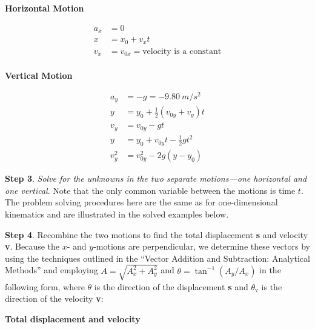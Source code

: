 \documentclass[../../main-ap-physics.tex]{subfiles}
\begin{document}
\begin{center}
    \textbf{Horizontal Motion}
\end{center}

\vspace{-1em}

\begin{align}
    a_x &= 0 \\[1ex]
    x &= x_0 + v_x t \\[1ex]
    v_x &= v_{0x} = \text{velocity is a constant} \\[1ex]
\end{align}

\begin{center}
    \textbf{Vertical Motion}
\end{center}

\vspace{-1em}

\begin{align}
    a_y &= -g = -\SI{9.80}{m/s^2} \\[1ex]
    y &= y_0 + \frac{1}{2} \left(v_{0y} + v_y\right) t \\[1ex]
    v_y &= v_{0y} - gt \\[1ex]
    y &= y_0 + v_{0y} t - \frac{1}{2} g t^2 \\[1ex]
    v_y^2 &= v_{0y}^2 - 2 g \left(y - y_0\right)
\end{align}

\textbf{Step 3}. \textit{Solve for the unknowns in the two separate motions---one horizontal and one vertical}. Note that the only common variable between the motions is time $t$. The problem solving procedures here are the same as for one-dimensional \gls{kinematics} and are illustrated in the solved examples below.

\vspace{1em}

\textbf{Step 4}. Recombine the two motions to find the total displacement \textbf{s} and velocity \textbf{v}. Because the $x$- and $y$-motions are perpendicular, we determine these vectors by using the techniques outlined in the ``Vector Addition and Subtraction: Analytical Methods'' and employing $A = \sqrt{A_x^2 + A_y^2}$ and  $\theta = \tan^{-1} \left(A_y/A_x\right)$ in the following form, where $\theta$ is the direction of the displacement \textbf{s} and $\theta_{\text{v}}$ is the direction of the velocity \textbf{v}:

\vspace{1em}

\textbf{Total displacement and velocity}
\end{document}

